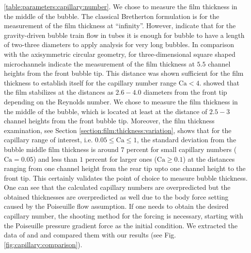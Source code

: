 \documentclass[preprint,12pt]{elsarticle}
\newcommand{\Ca}{\mathrm{Ca}}
\begin{document}
\ref{table:parameters:capillary:number}. 
{\color{red} We chose to measure the film thickness in the middle of the bubble. The
classical Bretherton formulation is for the measurement of the film thickness at ``infinity''.
However, \citet{cerro-bubble-train} indicate that for the gravity-driven bubble train flow in tubes
it is enough for bubble to have a length of two-three diameters to apply analysis for very long
bubbles. In comparison with the axisymmetric circular geometry, for three-dimensional square shaped
microchannels \citet{heil-threedim} indicate the measurement of the film thickness at $5.5$
channel heights from the front bubble tip. This distance was shown sufficient for the
film thickness to establish itself for the capillary number range $\Ca<4$.
\citet{giavedoni-numerical} showed that the film stabilizes at the distances as $2.6-4.0$ diameters
from the front tip depending on the Reynolds number.  We chose to measure the film thickness in the
middle of the bubble, which is located at least at the distance of $2.5-3$ channel heights from the
front bubble tip. Moreover, the film thickness examination, see Section
\ref{section:film:thickness:variation}, shows that for the capillary range of interest, i.e.
$0.05\leq \Ca \leq 1$, the standard deviation from the bubble middle film thickness is around $7$
percent for small capillary numbers ($\Ca=0.05$) and less than $1$ percent for larger ones ($\Ca
\geq 0.1$) at the distances ranging from one channel height from the rear tip upto one channel
height to the front tip. This certainly validates the point of choice to measure bubble thickness.}
One can see that the calculated
capillary numbers are overpredicted but the obtained thicknesses are overpredicted
as well due to the body force setting caused by the Poiseuille flow assumption. If one
needs to obtain the desired capillary number, the shooting method for the forcing is
necessary, starting with the Poiseuille pressure gradient force as the initial condition. We extracted
the data of 
\citet{giavedoni-numerical} and \citet{heil-bretherton} and compared them with our results (see 
Fig. \ref{fig:capillary:comparison}).
\end{document}
